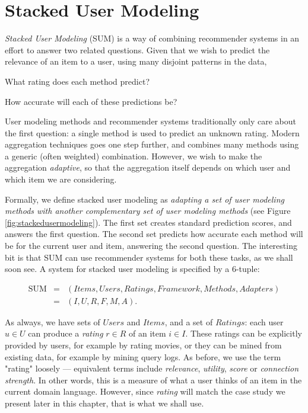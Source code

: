 \section{Stacked User Modeling}
\label{sec:usermetamodeling}

\emph{Stacked User Modeling} (SUM) is a way of combining recommender systems
in an effort to answer two related questions.
Given that we wish to predict the relevance of an item to a user,
using many disjoint patterns in the data,

\begin{enumerate*}
  \item What rating does each method predict?
  \item How accurate will each of these predictions be?
\end{enumerate*}

User modeling methods and recommender systems traditionally only care about the first question:
a single method is used to predict an unknown rating.
Modern aggregation techniques goes one step further, and combines many methods using a generic (often weighted) combination.
However, we wish to make the aggregation \emph{adaptive},
so that the aggregation itself depends on which user and which item we are considering.

Formally, we define stacked user modeling as \emph{adapting a set of user modeling methods
with another complementary set of user modeling methods} 
(see Figure \ref{fig:stackedusermodeling}).
The first set creates standard prediction scores, and answers the first question.
The second set predicts how accurate each method will be for the current user and item,
answering the second question.
The interesting bit is that SUM can use recommender systems for both these tasks, as we shall soon see.
A system for stacked user modeling is specified by a 6-tuple:

\begin{eqnarray*}
  \mathrm{SUM} &=& (Items, Users, Ratings, Framework, Methods, Adapters)\\
               &=& (I,U,R,F,M,A).
\end{eqnarray*}



As always, we have sets of $Users$ and $Items$, 
and a set of $Ratings$: each user $u \in U$ can produce a \emph{rating} $r \in R$ of an item $i \in I$.
These ratings can be explicitly provided by users, for example by rating movies,
or they can be mined from existing data, for example by mining query logs.
As before, we use the term "rating" loosely --- equivalent terms include \emph{relevance}, \emph{utility},
\emph{score} or \emph{connection strength}. In other words, this is a measure of what a user thinks of an item
in the current domain language. However, since \emph{rating} will match the case study we present later in this chapter,
that is what we shall use. 

